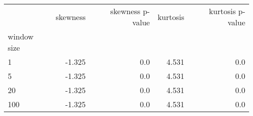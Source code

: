 \begin{tabular}{lrrrr}
\toprule
{} &  skewness &  skewness p-value &  kurtosis &  kurtosis p-value \\
window size &           &                   &           &                   \\
\midrule
1           &    -1.325 &               0.0 &     4.531 &               0.0 \\
5           &    -1.325 &               0.0 &     4.531 &               0.0 \\
20          &    -1.325 &               0.0 &     4.531 &               0.0 \\
100         &    -1.325 &               0.0 &     4.531 &               0.0 \\
\bottomrule
\end{tabular}
